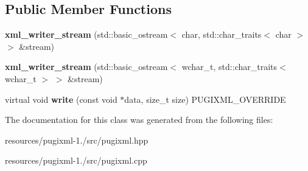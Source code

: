 \subsection*{Public Member Functions}
\begin{DoxyCompactItemize}
\item 
\hypertarget{classpugi_1_1xml__writer__stream_a259c28368c08378e15cf28b35a1dcd9a}{{\bfseries xml\+\_\+writer\+\_\+stream} (std\+::basic\+\_\+ostream$<$ char, std\+::char\+\_\+traits$<$ char $>$ $>$ \&stream)}\label{classpugi_1_1xml__writer__stream_a259c28368c08378e15cf28b35a1dcd9a}

\item 
\hypertarget{classpugi_1_1xml__writer__stream_afa342cf0bb3a0bd6ee3d47550ad23333}{{\bfseries xml\+\_\+writer\+\_\+stream} (std\+::basic\+\_\+ostream$<$ wchar\+\_\+t, std\+::char\+\_\+traits$<$ wchar\+\_\+t $>$ $>$ \&stream)}\label{classpugi_1_1xml__writer__stream_afa342cf0bb3a0bd6ee3d47550ad23333}

\item 
\hypertarget{classpugi_1_1xml__writer__stream_a331839df873b20fd6d32b25f3eeb5856}{virtual void {\bfseries write} (const void $\ast$data, size\+\_\+t size) P\+U\+G\+I\+X\+M\+L\+\_\+\+O\+V\+E\+R\+R\+I\+D\+E}\label{classpugi_1_1xml__writer__stream_a331839df873b20fd6d32b25f3eeb5856}

\end{DoxyCompactItemize}


The documentation for this class was generated from the following files\+:\begin{DoxyCompactItemize}
\item 
resources/pugixml-\/1./src/pugixml.\+hpp\item 
resources/pugixml-\/1./src/pugixml.\+cpp\end{DoxyCompactItemize}

